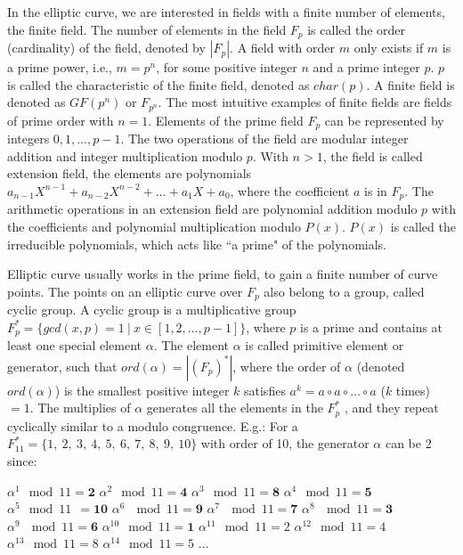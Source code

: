 In the elliptic curve, we are interested in fields with a finite number of elements, the finite field. The number of elements in the field $F_p$ is called the order (cardinality) of the field, denoted by $|F_p|$. A field with order $m$ only exists if $m$ is a prime power, i.e., $m = p^n$, for some positive integer $n$ and a prime integer $p$. $p$ is called the characteristic of the finite field, denoted as $char(p)$. A finite field is denoted as $GF(p^n)$ or $F_{p^n}$. The most intuitive examples of finite fields are fields of prime order with $n = 1$. Elements of the prime field $F_p$ can be represented by integers $0, 1, \dotso , p-1$. The two operations of the field are modular integer addition and integer multiplication modulo $p$. With $n > 1$, the field is called extension field, the elements are polynomials $a_{n-1}X^{n-1} + a_{n-2}X^{n-2} + \dotso + a_1X + a_0$, where the coefficient $a$ is in $F_p$. The arithmetic operations in an extension field are polynomial addition modulo $p$ with the coefficients and polynomial multiplication modulo $P(x)$. $P(x)$ is called the irreducible polynomials, which acts like ``a prime" of the polynomials.

Elliptic curve usually works in the prime field, to gain a finite number of curve points. The points on an elliptic curve over $F_p$ also belong to a group, called cyclic group. A cyclic group is a multiplicative group $F_p^* = \{ gcd(x,p) = 1 \ | \ x \in [ 1, 2, \dotso , p-1 ] \}$, where $p$ is a prime and contains at least one special element $\alpha$. The element $\alpha$ is called primitive element or generator, such that $ord(\alpha) = |(F_p)^*|$, where the order of $\alpha$ (denoted $ord(\alpha)$) is the smallest positive integer $k$ satisfies $a^k = a \circ a \circ \dotso \circ a$ ($k$ times) $= 1$. The multiplies of $\alpha$ generates all the elements in the $F_p^*$ , and they repeat cyclically similar to a modulo congruence. E.g.: For a $F_{11}^* = \{ 1, \ 2, \ 3, \ 4, \ 5, \ 6, \ 7, \ 8, \ 9, \ 10 \}$ with order of 10, the generator $\alpha$ can be 2 since:\\


\setlength{\columnsep}{3cm}
\begin{multicols}{3}
  $\alpha^1 \mod 11 = \mathbf{2}$
  $\alpha^2 \mod 11 = \mathbf{4}$
  $\alpha^3 \mod 11 = \mathbf{8}$
  $\alpha^4 \mod 11 = \mathbf{5}$
  $\alpha^5 \mod 11 \ \ = \mathbf{10}$
  $\alpha^6 \ \mod 11 = \mathbf{9}$
  $\alpha^7 \ \mod 11 = \mathbf{7}$
  $\alpha^8 \ \mod 11 = \mathbf{3}$
  $\alpha^9 \ \mod 11 = \mathbf{6}$
  $\alpha^{10} \mod 11 = \mathbf{1}$
  $\alpha^{11} \mod 11 = 2$
  $\alpha^{12} \mod 11 = 4$
  $\alpha^{13} \mod 11 = 8$
  $\alpha^{14} \mod 11 = 5$
  $\dotso$
\end{multicols}



